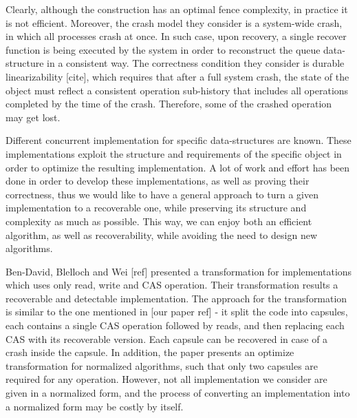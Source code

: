 Clearly, although the construction has an optimal fence complexity, in practice it is not efficient. Moreover, the crash model they consider is a system-wide crash, in which all processes crash at once. In such case, upon recovery, a single recover function is being executed by the system in order to reconstruct the queue data-structure in a consistent way. The correctness condition they consider is durable linearizability [cite], which requires that after a full system crash, the state of the object must reﬂect a consistent operation sub-history that includes all operations completed by the time of the crash. Therefore, some of the crashed operation may get lost.

Different concurrent implementation for specific data-structures are known. These implementations exploit the structure and requirements of the specific object in order to optimize the resulting implementation. A lot of work and effort has been done in order to develop these implementations, as well as proving their correctness, thus we would like to have a general approach to turn a given implementation to a recoverable one, while preserving its structure and complexity as much as possible. This way, we can enjoy both an efficient algorithm, as well as recoverability, while avoiding the need to design new algorithms.

Ben-David, Blelloch and Wei [ref] presented a transformation for implementations which uses only read, write and CAS operation. Their transformation results a recoverable and detectable implementation. The approach for the transformation is similar to the one mentioned in [our paper ref] - it split the code into capsules, each contains a single CAS operation followed by reads, and then replacing each CAS with its recoverable version. Each capsule can be recovered in case of a crash inside the capsule. In addition, the paper presents an optimize transformation for normalized algorithms, such that only two capsules are required for any operation. However, not all implementation we consider are given in a normalized form, and the process of converting an implementation into a normalized form may be costly by itself.

